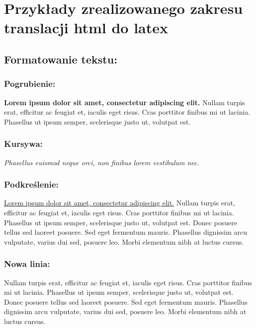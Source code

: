 \documentclass{report}
\begin{document}
    \chapter{Przykłady zrealizowanego zakresu translacji html do latex}

    \section{Formatowanie tekstu:}
        \subsection{Pogrubienie:}
            \textbf{Lorem ipsum dolor sit amet, consectetur adipiscing elit.} 
            Nullam turpis erat, efficitur ac feugiat et, iaculis eget 
            risus. Cras porttitor finibus mi ut lacinia. Phasellus ut 
            ipsum semper, scelerisque justo ut, volutpat est. 

        \subsection{Kursywa:}
            \textit{Phasellus euismod neque orci, non finibus lorem vestibulum nec.}

        \subsection{Podkreślenie:}
            \underline{Lorem ipsum dolor sit amet, consectetur adipiscing elit.} 
            Nullam turpis erat, efficitur ac feugiat et, iaculis eget 
            risus. Cras porttitor finibus mi ut lacinia. Phasellus ut 
            ipsum semper, scelerisque justo ut, volutpat est. Donec posuere 
            tellus sed laoreet posuere. Sed eget fermentum mauris. Phasellus 
            dignissim arcu vulputate, varius dui sed, posuere leo. Morbi 
            elementum nibh at luctus cursus. 
        
        \subsection{Nowa linia:}
            Nullam turpis erat, efficitur ac feugiat et, iaculis eget 
            risus. Cras porttitor finibus mi ut lacinia. Phasellus ut 
            ipsum semper, scelerisque justo ut, volutpat est. \newline Donec posuere 
            tellus sed laoreet posuere. Sed eget fermentum mauris. Phasellus 
            dignissim arcu vulputate, varius dui sed, posuere leo. Morbi 
            elementum nibh at luctus cursus. 
\end{document}
